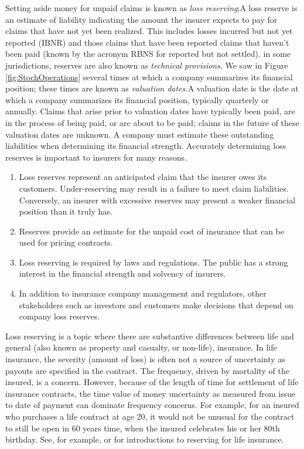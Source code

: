 \documentclass[]{book}
\theoremstyle{definition}
\theoremstyle{definition}
\theoremstyle{definition}
\theoremstyle{remark}
\begin{document}
Setting aside money for unpaid claims is known as \emph{loss
reserving};{A loss reserve is an estimate of liability indicating the
amount the insurer expects to pay for claims that have not yet been
realized. This includes losses incurred but not yet reported (IBNR) and
those claims that have been reported claims that haven't been paid
(known by the acronym RBNS for reported but not settled).} in some
jurisdictions, reserves are also known as \emph{technical provisions}.
We saw in Figure \ref{fig:StochOperations} several times at which a
company summarizes its financial position; these times are known as
\emph{valuation dates.}{A valuation date is the date at which a company
summarizes its financial position, typically quarterly or annually.}
Claims that arise prior to valuation dates have typically been paid, are
in the process of being paid, or are about to be paid; claims in the
future of these valuation dates are unknown. A company must estimate
these outstanding liabilities when determining its financial strength.
Accurately determining loss reserves is important to insurers for many
reasons.

\begin{enumerate}
\def\labelenumi{\arabic{enumi}.}
\item
  Loss reserves represent an anticipated claim that the insurer owes its
  customers. Under-reserving may result in a failure to meet claim
  liabilities. Conversely, an insurer with excessive reserves may
  present a weaker financial position than it truly has.
\item
  Reserves provide an estimate for the unpaid cost of insurance that can
  be used for pricing contracts.
\item
  Loss reserving is required by laws and regulations. The public has a
  strong interest in the financial strength and solvency of insurers.
\item
  In addition to insurance company management and regulators, other
  stakeholders such as investors and customers make decisions that
  depend on company loss reserves.
\end{enumerate}

Loss reserving is a topic where there are substantive differences
between life and general (also known as property and casualty, or
non-life), insurance. In life insurance, the severity (amount of loss)
is often not a source of uncertainty as payouts are specified in the
contract. The frequency, driven by mortality of the insured, is a
concern. However, because of the length of time for settlement of life
insurance contracts, the time value of money uncertainty as measured
from issue to date of payment can dominate frequency concerns. For
example, for an insured who purchases a life contract at age 20, it
would not be unusual for the contract to still be open in 60 years time,
when the insured celebrates his or her 80th birthday. See, for example,
\citet{bowers1986actuarial} or \citet{dickson2013actuarial} for
introductions to reserving for life insurance.
\end{document}
